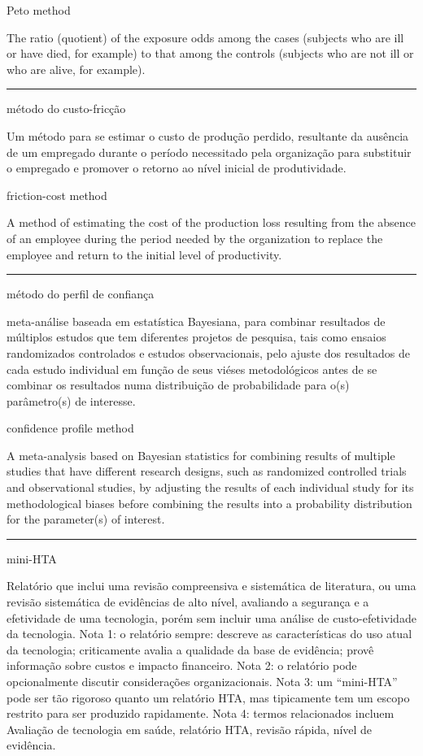 \documentclass[
  openany]{book}
\begin{document}
Peto method

The ratio (quotient) of the exposure odds among the cases (subjects who are ill or have died, for example) to that among the controls (subjects who are not ill or who are alive, for example).

\begin{center}\rule{0.5\linewidth}{0.5pt}\end{center}

método do custo-fricção

Um método para se estimar o custo de produção perdido, resultante da ausência de um empregado durante o período necessitado pela organização para substituir o empregado e promover o retorno ao nível inicial de produtividade.

friction-cost method

A method of estimating the cost of the production loss resulting from the absence of an employee during the period needed by the organization to replace the employee and return to the initial level of productivity.

\begin{center}\rule{0.5\linewidth}{0.5pt}\end{center}

método do perfil de confiança

meta-análise baseada em estatística Bayesiana, para combinar resultados de múltiplos estudos que tem diferentes projetos de pesquisa, tais como ensaios randomizados controlados e estudos observacionais, pelo ajuste dos resultados de cada estudo individual em função de seus viéses metodológicos antes de se combinar os resultados numa distribuição de probabilidade para o(s) parâmetro(s) de interesse.

confidence profile method

A meta-analysis based on Bayesian statistics for combining results of multiple studies that have different research designs, such as randomized controlled trials and observational studies, by adjusting the results of each individual study for its methodological biases before combining the results into a probability distribution for the parameter(s) of interest.

\begin{center}\rule{0.5\linewidth}{0.5pt}\end{center}

mini-HTA

Relatório que inclui uma revisão compreensiva e sistemática de literatura, ou uma revisão sistemática de evidências de alto nível, avaliando a segurança e a efetividade de uma tecnologia, porém sem incluir uma análise de custo-efetividade da tecnologia. Nota 1: o relatório sempre: descreve as características do uso atual da tecnologia; criticamente avalia a qualidade da base de evidência; provê informação sobre custos e impacto financeiro. Nota 2: o relatório pode opcionalmente discutir considerações organizacionais. Nota 3: um ``mini-HTA'' pode ser tão rigoroso quanto um relatório HTA, mas tipicamente tem um escopo restrito para ser produzido rapidamente. Nota 4: termos relacionados incluem Avaliação de tecnologia em saúde, relatório HTA, revisão rápida, nível de evidência.
\end{document}
